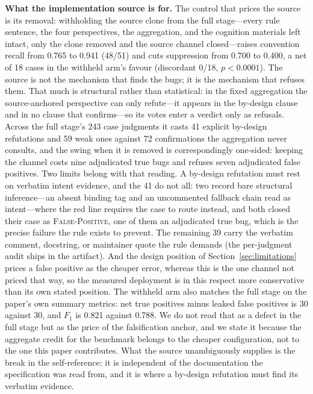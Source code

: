 \documentclass[acmsmall,screen,review,anonymous]{acmart}
\begin{document}
\textbf{What the implementation source is for.} The control that prices the source is its removal: withholding the source clone from the full stage---every rule sentence, the four perspectives, the aggregation, and the cognition materials left intact, only the clone removed and the source channel closed---raises convention recall from 0.765 to 0.941 (48/51) and cuts suppression from 0.700 to 0.400, a net of 18 cases in the withheld arm's favour (discordant 0/18, $p{<}0.0001$). The source is not the mechanism that finds the bugs; it is the mechanism that refuses them. That much is structural rather than statistical: in the fixed aggregation the source-anchored perspective can only refute---it appears in the by-design clause and in no clause that confirms---so its votes enter a verdict only as refusals. Across the full stage's 243 case judgments it casts 41 explicit by-design refutations and 59 weak ones against 72 confirmations the aggregation never consults, and the swing when it is removed is correspondingly one-sided: keeping the channel costs nine adjudicated true bugs and refuses seven adjudicated false positives. Two limits belong with that reading. A by-design refutation must rest on verbatim intent evidence, and the 41 do not all: two record bare structural inference---an absent binding tag and an uncommented fallback chain read as intent---where the red line requires the case to route instead, and both closed their case as \textsc{False-Positive}, one of them an adjudicated true bug, which is the precise failure the rule exists to prevent. The remaining 39 carry the verbatim comment, docstring, or maintainer quote the rule demands (the per-judgment audit ships in the artifact). And the design position of Section~\ref{sec:limitations} prices a false positive as the cheaper error, whereas this is the one channel not priced that way, so the measured deployment is in this respect more conservative than its own stated position. The withheld arm also matches the full stage on the paper's own summary metrics: net true positives minus leaked false positives is 30 against 30, and $F_1$ is 0.821 against 0.788. We do not read that as a defect in the full stage but as the price of the falsification anchor, and we state it because the aggregate credit for the benchmark belongs to the cheaper configuration, not to the one this paper contributes. What the source unambiguously supplies is the break in the self-reference: it is independent of the documentation the specification was read from, and it is where a by-design refutation must find its verbatim evidence.
\end{document}
